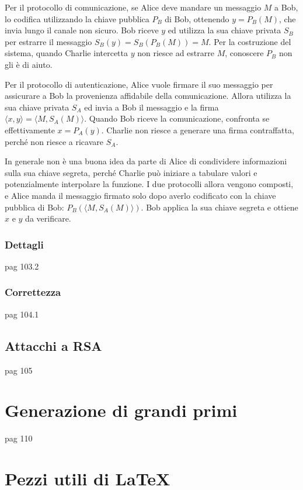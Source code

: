 Per il protocollo di comunicazione, se Alice deve mandare un messaggio $M$ a Bob,
lo codifica utilizzando la chiave pubblica $P_B$ di Bob, ottenendo $
y = P_B(M)
$, che invia lungo il canale non sicuro.
Bob riceve $y$ ed utilizza la sua chiave privata $S_B$ per estrarre il messaggio $
S_B(y) = 
S_B \left( P_B \left( M \right) \right) = M
$.
Per la costruzione del sistema, quando Charlie intercetta $y$ non riesce ad estrarre $M$, conoscere $P_B$ non gli è di aiuto.

Per il protocollo di autenticazione, Alice vuole firmare il suo messaggio per assicurare a Bob la provenienza affidabile della comunicazione. Allora utilizza la sua chiave privata $S_A$ ed invia a Bob il messaggio e la firma $
\langle x, y \rangle
=
\langle M, S_A(M) \rangle
$. Quando Bob riceve la comunicazione, confronta se effettivamente $
x = P_A(y)
$.
Charlie non riesce a generare una firma contraffatta, perché non riesce a ricavare $S_A$.

In generale non è una buona idea da parte di Alice di condividere informazioni sulla sua chiave segreta, perché Charlie può iniziare a tabulare valori e potenzialmente interpolare la funzione.
I due protocolli allora vengono composti, e Alice manda il messaggio firmato solo dopo averlo codificato con la chiave pubblica di Bob: $
P_B \left( 
\langle M, S_A(M) \rangle
\right)
$. Bob applica la sua chiave segreta e ottiene $x$ e $y$ da verificare.

\subsubsection{Dettagli}
pag 103.2

\subsubsection{Correttezza}
pag 104.1

\subsection{Attacchi a RSA}
pag 105

\section{Generazione di grandi primi}
pag 110

\section{Pezzi utili di \LaTeX{}}


